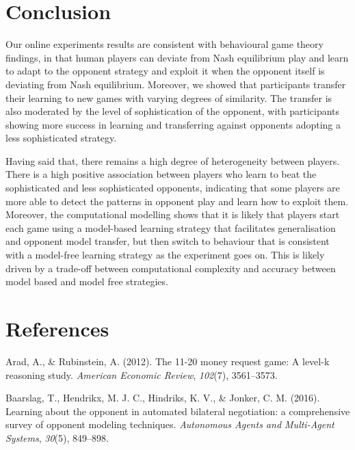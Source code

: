 \documentclass[man,floatsintext]{apa6}
\begin{document}
\newpage

\hypertarget{conclusion}{%
\section{Conclusion}\label{conclusion}}

Our online experiments results are consistent with behavioural game theory findings, in that human players can deviate from Nash equilibrium play and learn to adapt to the opponent strategy and exploit it when the opponent itself is deviating from Nash equilibrium. Moreover, we showed that participants transfer their learning to new games with varying degrees of similarity. The transfer is also moderated by the level of sophistication of the opponent, with participants showing more success in learning and transferring against opponents adopting a less sophisticated strategy.

Having said that, there remains a high degree of heterogeneity between players. There is a high positive association between players who learn to beat the sophisticated and less sophisticated opponents, indicating that some players are more able to detect the patterns in opponent play and learn how to exploit them. Moreover, the computational modelling shows that it is likely that players start each game using a model-based learning strategy that facilitates generalisation and opponent model transfer, but then switch to behaviour that is consistent with a model-free learning strategy as the experiment goes on. This is likely driven by a trade-off between computational complexity and accuracy between model based and model free strategies.
\newpage

\hypertarget{references}{%
\section{References}\label{references}}

\begingroup
\setlength{\parindent}{-0.5in}
\setlength{\leftskip}{0.5in}

\hypertarget{refs}{}
\leavevmode\hypertarget{ref-arad201211}{}%
Arad, A., \& Rubinstein, A. (2012). The 11-20 money request game: A level-k reasoning study. \emph{American Economic Review}, \emph{102}(7), 3561--3573.

\leavevmode\hypertarget{ref-baarslag2016learning}{}%
Baarslag, T., Hendrikx, M. J. C., Hindriks, K. V., \& Jonker, C. M. (2016). Learning about the opponent in automated bilateral negotiation: a comprehensive survey of opponent modeling techniques. \emph{Autonomous Agents and Multi-Agent Systems}, \emph{30}(5), 849--898.
\end{document}
